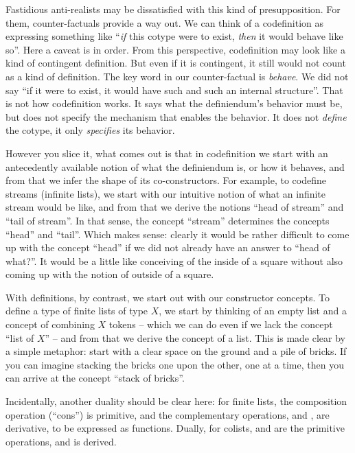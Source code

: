Fastidious anti-realists may be dissatisfied with this kind of
presupposition. For them, counter-factuals provide a way out. We can
think of a codefinition as expressing something like ``\textit{if}
this cotype were to exist, \textit{then} it would behave like so''.
Here a caveat is in order. From this perspective, codefinition may
look like a kind of contingent definition. But even if it is
contingent, it still would not count as a kind of definition. The key
word in our counter-factual is \textit{behave}. We did not say ``if it
were to exist, it would have such and such an internal structure''.
That is not how codefinition works. It says what the definiendum's
behavior must be, but does not specify the mechanism that enables the
behavior. It does not \textit{define} the cotype, it only
\textit{specifies} its behavior.

However you slice it, what comes out is that in codefinition we start
with an antecedently available notion of what the definiendum is, or
how it behaves, and from that we infer the shape of its
co-constructors. For example, to codefine streams (infinite lists), we
start with our intuitive notion of what an infinite stream would be
like, and from that we derive the notions ``head of stream'' and ``tail
of stream''. In that sense, the concept ``stream'' determines the
concepts ``head'' and ``tail''. Which makes sense: clearly it would be
rather difficult to come up with the concept ``head'' if we did not
already have an answer to ``head of what?''. It would be a little
like conceiving of the inside of a square without also coming up with
the notion of outside of a square.

With definitions, by contrast, we start out with our constructor
concepts. To define a type of finite lists of type \(X\), we start by
thinking of an empty list and a concept of combining \(X\) tokens --
which we can do even if we lack the concept ``list of \(X\)'' -- and
from that we derive the concept of a list. This is made clear by a
simple metaphor: start with a clear space on the ground and a pile of
bricks. If you can imagine stacking the bricks one upon the other, one
at a time, then you can arrive at the concept ``stack of bricks''.

Incidentally, another duality should be clear here: for finite lists,
the composition operation (``cons'') is primitive, and the
complementary operations, \head{} and \tail{}, are derivative, to be
expressed as functions. Dually, for colists, \cohead{} and \cotail{}
are the primitive operations, and \cocons{} is derived.

